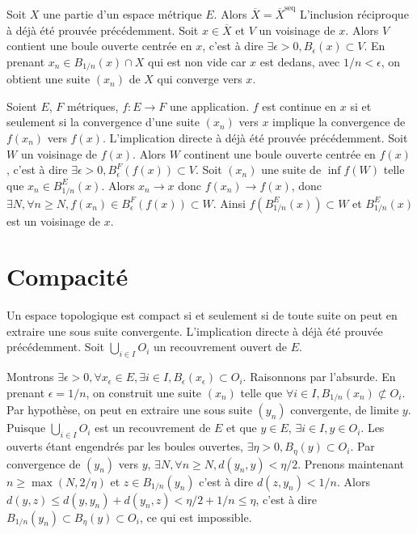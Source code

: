 \documentclass[a4paper, 11pt, french]{book}
\theoremstyle{plain} %
\theoremstyle{definition} %
\theoremstyle{remark} %
\newcommand{\1}{\mathds{1}}
\newcommand{\infegal}{\leqslant}
\newcommand{\supegal}{\geqslant}
\begin{document}
\proposition
Soit $X$ une partie d'un espace métrique $E$.
Alors $\overline{X}=\overline{X}^\text{seq}$
\demonstration
L'inclusion réciproque à déjà été prouvée précédemment.
Soit $x\in\overline{X}$ et $V$ un voisinage de $x$.
Alors $V$ contient une boule ouverte centrée en $x$, c'est à dire $\exists\epsilon>0, B_\epsilon(x)\subset V$.
En prenant $x_n\in B_{1/n}(x)\cap X$ qui est non vide car $x$ est dedans, avec $1/n<\epsilon$, on obtient une suite $(x_n)$ de $X$ qui converge vers $x$.

\proposition
Soient $E$, $F$ métriques, $f:E\rightarrow F$ une application.
$f$ est continue en $x$ si et seulement si la convergence d'une suite $(x_n)$ vers $x$ implique la convergence de $f(x_n)$ vers $f(x)$.
\demonstration
L'implication directe à déjà été prouvée précédemment.
Soit $W$ un voisinage de $f(x)$.
Alors $W$ continent une boule ouverte centrée en $f(x)$, c'est à dire $\exists\epsilon>0, B^F_\epsilon(f(x))\subset V$.
Soit $(x_n)$ une suite de $\inf{f}(W)$ telle que $x_n\in B^E_{1/n}(x)$.
Alors $x_n\rightarrow x$ donc $f(x_n)\rightarrow f(x)$, donc $\exists N, \forall n\supegal N, f(x_n)\in B^F_\epsilon(f(x))\subset W$.
Ainsi $f(B^E_{1/n}(x))\subset W$ et $B^E_{1/n}(x)$ est un voisinage de $x$.

\section{Compacité}

\proposition
Un espace topologique est compact si et seulement si de toute suite on peut en extraire une sous suite convergente.
\demonstration
L'implication directe à déjà été prouvée précédemment.
Soit $\bigcup_{i\in I}O_i$ un recouvrement ouvert de $E$.

Montrons $\exists\epsilon>0, \forall x_\epsilon\in E, \exists i\in I, B_\epsilon(x_\epsilon)\subset O_i$.
Raisonnons par l'absurde.
En prenant $\epsilon=1/n$, on construit une suite $(x_n)$ telle que $\forall i\in I, B_{1/n}(x_n)\not\subset O_i$.
Par hypothèse, on peut en extraire une sous suite $(y_n)$ convergente, de limite $y$.
Puisque $\bigcup_{i\in I}O_i$ est un recouvrement de $E$ et que $y\in E$, $\exists i\in I, y\in O_i$.
Les ouverts étant engendrés par les boules ouvertes, $\exists\eta>0, B_\eta(y)\subset O_i$.
Par convergence de $(y_n)$ vers $y$, $\exists N, \forall n\supegal N, d(y_n, y)<\eta/2$.
Prenons maintenant $n\supegal\max(N, 2/\eta)$ et $z\in B_{1/n}(y_n)$ c'est à dire $d(z, y_n)<1/n$.
Alors $d(y, z)\infegal d(y, y_n)+d(y_n, z)<\eta/2+1/n\infegal\eta$, c'est à dire $B_{1/n}(y_n)\subset B_\eta(y)\subset O_i$, ce qui est impossible.
\end{document}
